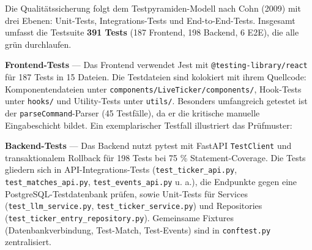Die Qualitätssicherung folgt dem Testpyramiden-Modell nach Cohn (2009)
mit drei Ebenen: Unit-Tests, Integrations-Tests und End-to-End-Tests.
Insgesamt umfasst die Testsuite \textbf{391 Tests} (187 Frontend, 198
Backend, 6 E2E), die alle grün durchlaufen.

\textbf{Frontend-Tests} --- Das Frontend verwendet Jest mit
\texttt{@testing-library/react} für 187 Tests in 15 Dateien. Die
Testdateien sind kolokiert mit ihrem Quellcode: Komponentendateien unter
\texttt{components/LiveTicker/components/}, Hook-Tests unter
\texttt{hooks/} und Utility-Tests unter \texttt{utils/}. Besonders
umfangreich getestet ist der \texttt{parseCommand}-Parser (45
Testfälle), da er die kritische manuelle Eingabeschicht bildet. Ein
exemplarischer Testfall illustriert das Prüfmuster:

\begin{Shaded}
\begin{Highlighting}[]
\NormalTok{(}\OperatorTok{,}\NormalTok{ () }\KeywordTok{=\textgreater{}}\NormalTok{ \{}
  \OperatorTok{=} \NormalTok{(}\OperatorTok{,} \NormalTok{)}\OperatorTok{;}
  \NormalTok{)}\NormalTok{(}\NormalTok{)}\OperatorTok{;}
  \NormalTok{)}\NormalTok{(}\NormalTok{)}\OperatorTok{;}
  \NormalTok{)}\NormalTok{(}\NormalTok{)}\OperatorTok{;}
  \NormalTok{)}\NormalTok{(}\NormalTok{)}\OperatorTok{;}
  \NormalTok{)}\NormalTok{(}\NormalTok{)}\OperatorTok{;}
\NormalTok{\})}\OperatorTok{;}
\end{Highlighting}
\end{Shaded}

\textbf{Backend-Tests} --- Das Backend nutzt pytest mit FastAPI
\texttt{TestClient} und transaktionalem Rollback für 198 Tests bei 75 \%
Statement-Coverage. Die Tests gliedern sich in API-Integrations-Tests
(\texttt{test\_ticker\_api.py}, \texttt{test\_matches\_api.py},
\texttt{test\_events\_api.py} u. a.), die Endpunkte gegen eine
PostgreSQL-Testdatenbank prüfen, sowie Unit-Tests für Services
(\texttt{test\_llm\_service.py}, \texttt{test\_ticker\_service.py}) und
Repositories (\texttt{test\_ticker\_entry\_repository.py}). Gemeinsame
Fixtures (Datenbankverbindung, Test-Match, Test-Events) sind in
\texttt{conftest.py} zentralisiert.

